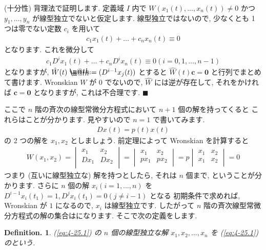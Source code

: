 \documentclass[openany, a4paper, oneside]{book}
\makeatletter
\newcommand*{\defeq}{\mathrel{\rlap{%
\raisebox{0.3ex}{$\m@th\cdot$}}%
\raisebox{-0.3ex}{$\m@th\cdot$}}%
=}
\theoremstyle{break}
\theoremstyle{breakdefn}
\newtheorem{defn}[thm]{Definition.}
\newcommand{\bs}{\blacksquare}
\makeatother
\begin{document}
(十分性)
背理法で証明します.
定義域 $I$ 内で $W ( x_1 (t) , \dots ,x_n (t)) \not= 0$ かつ $y_1, \dots , y_n$ が線型独立でないと仮定します.
線型独立ではないので, 少なくとも 1 つは零でない定数 $c_i$ を用いて
\begin{gather}
c_1 x_1 (t) + \dots + c_n x_n (t) \equiv 0
\end{gather}
となります.
これを微分して
\begin{gather}
c_1 D^i x_1 (t) + \dots + c_n D^i x_n (t) \equiv 0
( i = 0, 1, \dots , n-1)
\end{gather}
となりますが,  $\hat{W}(t) \defeq ( D^{i-1} x_j (t) )$ とすると
$\hat{W}(t) \bm{c} = \bm{0}$ と行列でまとめて書けます.
Wronskian $W$ が $0$ でないので,  $\hat{W}$ には逆が存在して, それをかければ $\bm{c} = \bm{0}$ となりますが,
これは不合理です.  $\bs$

ここで $n$ 階の斉次の線型常微分方程式において $n+1$ 個の解を持ってくると
これらはことが分かります.
見やすいので $n=1$ で書いてみます.
\begin{gather}
D x (t) = p (t) x (t)
\end{gather}
の 2 つの解を $x_1 , x_2$ としましょう.
前定理によって Wronskian を計算すると
\begin{gather}
W (x_1,x_2)
=
\begin{vmatrix}
x_1 & x_2 \\
Dx_1 & D x_2 \\
\end{vmatrix}
=
\begin{vmatrix}
x_1 & x_2 \\
p x_1 & p x_2 \\
\end{vmatrix}
=
p
\begin{vmatrix}
x_1 & x_2 \\
x_1 & x_2 \\
\end{vmatrix}
=
0
\end{gather}
つまり (互いに線型独立な) 解を持つとしたら, それは $n$ 個まで, ということが分かります.
さらに $n$ 個の解 $x_i (i=1,\dots,n)$ を $D^{i-1}x_i (t_1)=1 ,D^{j}x_i (t_1)=0 (j\not= i-1)$ となる
初期条件で求めれば, Wronskian が $1$ になるので,  $x_i$ は線型独立です.
したがって $n$ 階の斉次線型常微分方程式の解の集合はになります.
そこで次の定義をします.
\begin{defn}
(\ref{eq:4-25.1}) の $n$ 個の線型独立な解 $x_1, x_2 , \dots , x_n$ を
(\ref{eq:4-25.1}) のという.
\end{defn}
\end{document}
